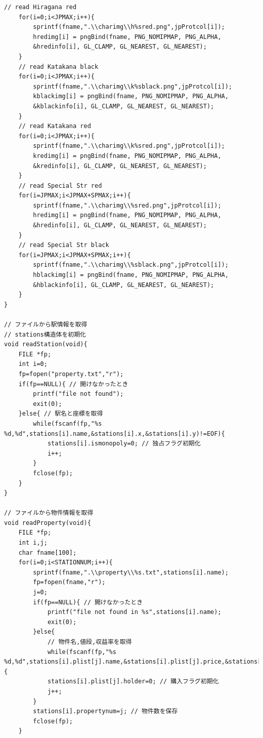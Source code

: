 \documentclass[a4j]{jarticle}
\begin{document}
\begin{lstlisting}[basicstyle=\ttfamily\footnotesize, frame=single,label=code2,caption=game.c]
    // read Hiragana red
    for(i=0;i<JPMAX;i++){
        sprintf(fname,".\\charimg\\h%sred.png",jpProtcol[i]);
        hredimg[i] = pngBind(fname, PNG_NOMIPMAP, PNG_ALPHA, 
        &hredinfo[i], GL_CLAMP, GL_NEAREST, GL_NEAREST);
    }
    // read Katakana black
    for(i=0;i<JPMAX;i++){
        sprintf(fname,".\\charimg\\k%sblack.png",jpProtcol[i]);
        kblackimg[i] = pngBind(fname, PNG_NOMIPMAP, PNG_ALPHA, 
        &kblackinfo[i], GL_CLAMP, GL_NEAREST, GL_NEAREST);
    }
    // read Katakana red
    for(i=0;i<JPMAX;i++){
        sprintf(fname,".\\charimg\\k%sred.png",jpProtcol[i]);
        kredimg[i] = pngBind(fname, PNG_NOMIPMAP, PNG_ALPHA, 
        &kredinfo[i], GL_CLAMP, GL_NEAREST, GL_NEAREST);
    }
    // read Special Str red
    for(i=JPMAX;i<JPMAX+SPMAX;i++){
        sprintf(fname,".\\charimg\\%sred.png",jpProtcol[i]);
        hredimg[i] = pngBind(fname, PNG_NOMIPMAP, PNG_ALPHA, 
        &hredinfo[i], GL_CLAMP, GL_NEAREST, GL_NEAREST);
    }
    // read Special Str black
    for(i=JPMAX;i<JPMAX+SPMAX;i++){
        sprintf(fname,".\\charimg\\%sblack.png",jpProtcol[i]);
        hblackimg[i] = pngBind(fname, PNG_NOMIPMAP, PNG_ALPHA, 
        &hblackinfo[i], GL_CLAMP, GL_NEAREST, GL_NEAREST);
    }
}

// ファイルから駅情報を取得
// stations構造体を初期化
void readStation(void){
    FILE *fp;
    int i=0;
    fp=fopen("property.txt","r");
    if(fp==NULL){ // 開けなかったとき
        printf("file not found");
        exit(0);
    }else{ // 駅名と座標を取得
        while(fscanf(fp,"%s %d,%d",stations[i].name,&stations[i].x,&stations[i].y)!=EOF){
            stations[i].ismonopoly=0; // 独占フラグ初期化
            i++;
        }
        fclose(fp);
    }
}

// ファイルから物件情報を取得
void readProperty(void){
    FILE *fp;
    int i,j;
    char fname[100];
    for(i=0;i<STATIONNUM;i++){
        sprintf(fname,".\\property\\%s.txt",stations[i].name);
        fp=fopen(fname,"r");
        j=0;
        if(fp==NULL){ // 開けなかったとき
            printf("file not found in %s",stations[i].name);
            exit(0);
        }else{
            // 物件名,値段,収益率を取得
            while(fscanf(fp,"%s %d,%d",stations[i].plist[j].name,&stations[i].plist[j].price,&stations[i].plist[j].earnings)!=EOF){
            stations[i].plist[j].holder=0; // 購入フラグ初期化
            j++;
        }
        stations[i].propertynum=j; // 物件数を保存
        fclose(fp);
    }


\end{lstlisting}
\end{document}
